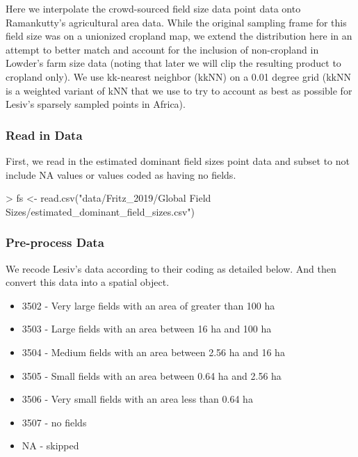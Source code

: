 \documentclass{article}
\begin{document}
Here we interpolate the crowd-sourced field size data point data onto Ramankutty's agricultural area data. While the original sampling frame for this field size was on a unionized cropland map, we extend the distribution here in an attempt to better match and account for the inclusion of non-cropland in Lowder's farm size data (noting that later we will clip the resulting product to cropland only).  We use kk-nearest neighbor (kkNN) on a 0.01 degree grid (kkNN is a weighted variant of kNN that we use to try to account as best as possible for Lesiv's sparsely sampled points in Africa).

\subsubsection{Read in Data}

First, we read in the estimated dominant field sizes point data and subset to not include NA values or values coded as having no fields.
\begin{Schunk}
\begin{Sinput}
> fs <- read.csv("data/Fritz_2019/Global Field Sizes/estimated_dominant_field_sizes.csv")
\end{Sinput}
\end{Schunk}

\subsubsection{Pre-process Data}

We recode Lesiv's data according to their coding as detailed below. And then convert this data into a spatial object.

\begin{itemize}
  \item 3502 - Very large fields with an area of greater than 100 ha
  \item 3503 - Large fields with an area between 16 ha and 100 ha
  \item 3504 - Medium fields with an area between 2.56 ha and 16 ha
  \item 3505 - Small fields with an area between 0.64 ha and 2.56 ha
  \item 3506 - Very small fields with an area less than 0.64 ha
  \item 3507 - no fields
  \item NA - skipped
\end{itemize}
\end{document}

